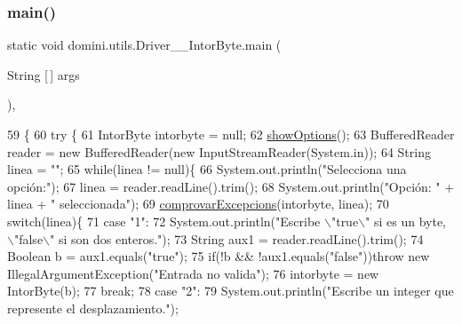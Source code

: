 \subsubsection{\texorpdfstring{main()}{main()}}
{\footnotesize\ttfamily static void domini.\+utils.\+Driver\+\_\+\+\_\+\+Intor\+Byte.\+main (\begin{DoxyParamCaption}\item[{String \mbox{[}$\,$\mbox{]}}]{args }\end{DoxyParamCaption})\hspace{0.3cm}{\ttfamily [inline]}, {\ttfamily [static]}}


\begin{DoxyCode}
59                                            \{
60     \textcolor{keywordflow}{try} \{
61         IntorByte intorbyte = null;
62         \hyperlink{classdomini_1_1utils_1_1Driver____IntorByte_a4b647dae1760fc058de9a7311595d8dd}{showOptions}();
63         BufferedReader reader = \textcolor{keyword}{new} BufferedReader(\textcolor{keyword}{new} InputStreamReader(System.in));
64         String linea = \textcolor{stringliteral}{""};
65         \textcolor{keywordflow}{while}(linea != null)\{
66             System.out.println(\textcolor{stringliteral}{"Selecciona una opción:"});
67             linea = reader.readLine().trim();
68             System.out.println(\textcolor{stringliteral}{"Opción: "} + linea + \textcolor{stringliteral}{" seleccionada"});
69             \hyperlink{classdomini_1_1utils_1_1Driver____IntorByte_a3cb28e1e1b318e0b8e4809ebd171c8b2}{comprovarExcepcions}(intorbyte, linea);
70             \textcolor{keywordflow}{switch}(linea)\{
71                 \textcolor{keywordflow}{case} \textcolor{stringliteral}{"1"}:
72                     System.out.println(\textcolor{stringliteral}{"Escribe \(\backslash\)"true\(\backslash\)" si es un byte, \(\backslash\)"false\(\backslash\)" si son dos enteros."});
73                     String aux1 = reader.readLine().trim();
74                     Boolean b = aux1.equals(\textcolor{stringliteral}{"true"});
75                     \textcolor{keywordflow}{if}(!b && !aux1.equals(\textcolor{stringliteral}{"false"}))\textcolor{keywordflow}{throw} \textcolor{keyword}{new} IllegalArgumentException(\textcolor{stringliteral}{"Entrada no valida"});
76                     intorbyte = \textcolor{keyword}{new} IntorByte(b);
77                 \textcolor{keywordflow}{break};
78                 \textcolor{keywordflow}{case} \textcolor{stringliteral}{"2"}:
79                     System.out.println(\textcolor{stringliteral}{"Escribe un integer que represente el desplazamiento."});

\end{DoxyCode}
